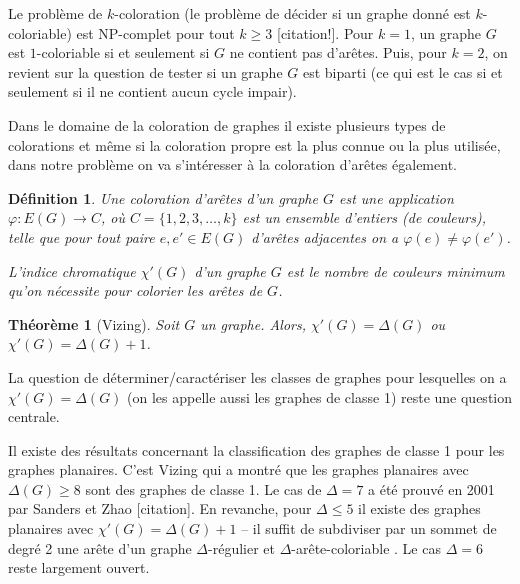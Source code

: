 \documentclass[10pt,a4paper]{article}
\newtheorem{definition}{Définition}
\newtheorem{theorem}{Théorème}
\begin{document}

Le problème de $k$-coloration (le problème de décider si un graphe donné est $k$-coloriable) est NP-complet pour tout $k \geq 3$ {\color{blue}[citation!]}. Pour $k = 1$, un graphe $G$ est $1$-coloriable si et seulement si $G$ ne contient pas d'arêtes. Puis, pour $k =  2$, on revient sur la question de tester si un graphe $G$ est biparti (ce qui est le cas si et seulement si il ne contient aucun cycle impair). 

Dans le domaine de la coloration de graphes il existe plusieurs types de colorations et même si la coloration propre est la plus connue ou la plus utilisée, dans notre problème on va s'intéresser à la coloration d'arêtes également.

\begin{definition}%
Une \emph{coloration d'arêtes} d'un graphe $G$ est une application $\varphi: E(G) \to C$, où $C=\{1,2,3,\dots,k\}$ est un ensemble d'entiers (de \emph{couleurs}), telle que pour tout paire $e, e' \in E(G)$ d'arêtes adjacentes on a $\varphi(e) \neq \varphi(e')$.

L'\emph{indice chromatique} $\chi'(G)$ d'un graphe $G$ est le nombre de couleurs minimum qu'on nécessite pour colorier les arêtes de $G$.
\end{definition}

\begin{theorem}[Vizing]
Soit $G$ un graphe. Alors, $\chi'(G) = \Delta(G)$ ou $\chi'(G) = \Delta(G) + 1$.
\end{theorem}

La question de déterminer/caractériser les classes de graphes pour lesquelles on a $\chi'(G) = \Delta(G)$ (on les appelle aussi les graphes de classe 1) reste une question centrale. 

Il existe des résultats concernant la classification des graphes de classe 1 pour les graphes planaires.
C'est Vizing \cite{Vizing} qui a montré que les graphes planaires avec $\Delta(G)\ge 8$ sont des graphes de classe 1. Le cas de $\Delta = 7$ a été prouvé en 2001 par Sanders et Zhao [citation]. 
En revanche, pour $\Delta\le 5$ il existe des graphes planaires avec $\chi'(G)=\Delta(G)+1$ -- il suffit de subdiviser par un sommet de degré 2 une arête d'un graphe $\Delta$-régulier et $\Delta$-arête-coloriable \cite{Vizing2}.
Le cas $\Delta = 6$ reste largement ouvert. 
\end{document}
